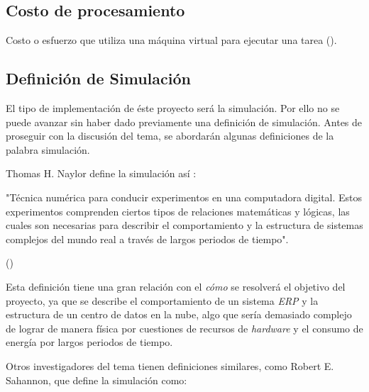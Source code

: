 \subsection*{Costo de procesamiento}

Costo o esfuerzo que utiliza una máquina virtual para ejecutar una tarea (\cite{redhat}). 

\subsection*{Definición de Simulación}

El tipo de implementación de éste proyecto será la simulación. Por ello no se puede avanzar sin haber dado previamente una definición de simulación. Antes de proseguir con la discusión del tema, se abordarán algunas definiciones de la palabra simulación.

Thomas H. Naylor define la simulación así : 

\begin{center}
	\begin{minipage}{0.8\linewidth}
		\vspace{5pt}%
		{\small
			"Técnica numérica para conducir experimentos en una computadora digital. Estos experimentos comprenden ciertos tipos de relaciones matemáticas y lógicas, las cuales son necesarias para describir el comportamiento y la estructura de sistemas complejos del mundo real a través de largos periodos de tiempo".
		}
		\begin{flushright}
			(\cite{naylor1967})
		\end{flushright}
		\vspace{5pt}%
	\end{minipage}
\end{center}

	Esta definición tiene una gran relación con el \textit{cómo} se resolverá el objetivo del proyecto, ya que se describe el comportamiento de un sistema \textit{ERP} y la estructura de un centro de datos en la nube, algo que sería demasiado complejo de lograr de manera física por cuestiones de recursos de \textit{hardware} y el consumo de energía por largos periodos de tiempo.

Otros investigadores del tema tienen definiciones similares, como Robert E. Sahannon, que define la simulación como:

